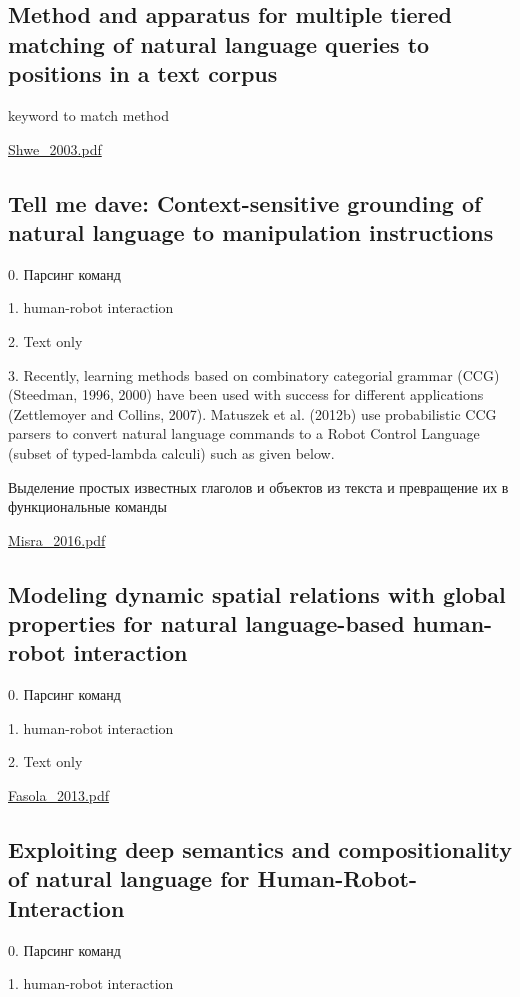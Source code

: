 \subsection{Method and apparatus for multiple tiered matching of natural language queries to positions in a text corpus}

keyword to match method

\url{Shwe_2003.pdf}\cite{Shwe_2003}

\subsection{Tell me dave: Context-sensitive grounding of natural language to manipulation instructions}

0. Парсинг команд

1. human-robot interaction

2. Text only

3. Recently, learning methods based on combinatory categorial
grammar (CCG) (Steedman, 1996, 2000) have been
used with success for different applications (Zettlemoyer
and Collins, 2007). Matuszek et al. (2012b) use probabilistic
CCG parsers to convert natural language commands to
a Robot Control Language (subset of typed-lambda calculi)
such as given below.

Выделение простых известных глаголов и объектов из текста и превращение их в функциональные команды

\url{Misra_2016.pdf}\cite{Misra_2016}

\subsection{Modeling dynamic spatial relations with global properties for natural language-based human-robot interaction}

0. Парсинг команд

1. human-robot interaction

2. Text only



\url{Fasola_2013.pdf}\cite{Fasola_2013}

\subsection{Exploiting deep semantics and compositionality of natural language for Human-Robot-Interaction}

0. Парсинг команд

1. human-robot interaction

